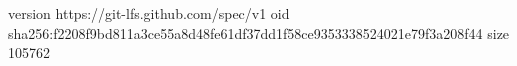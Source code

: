 version https://git-lfs.github.com/spec/v1
oid sha256:f2208f9bd811a3ce55a8d48fe61df37dd1f58ce9353338524021e79f3a208f44
size 105762
